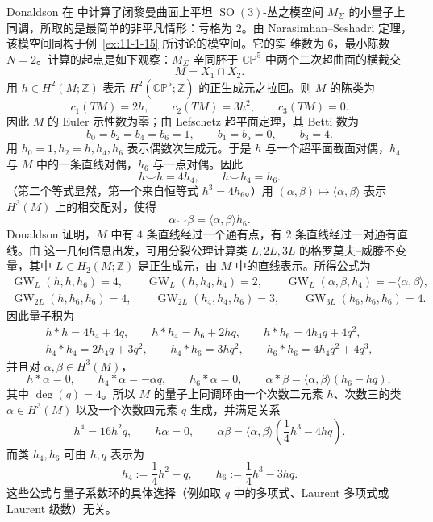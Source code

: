 \begin{example}\label{ex:11-1-16}
Donaldson 在  中计算了闭黎曼曲面上平坦 $\operatorname{SO}(3)$-丛之模空间
$M_\Sigma$ 的小量子上同调，所取的是最简单的非平凡情形：亏格为 $2$。由
Narasimhan--Seshadri 定理，该模空间同构于例~\ref{ex:11-1-15} 所讨论的模空间。它的实
维数为 $6$，最小陈数 $N=2$。计算的起点是如下观察：$M_\Sigma$ 辛同胚于
$\mathbb{CP}^5$ 中两个二次超曲面的横截交
\[
  M=X_1\cap X_2.
\]
用 $h\in H^2(M;\mathbb Z)$ 表示 $H^2(\mathbb{CP}^5;\mathbb Z)$ 的正生成元之拉回。则
$M$ 的陈类为
\[
  c_1(TM)=2h,\qquad c_2(TM)=3h^2,\qquad c_3(TM)=0.
\]
因此 $M$ 的 Euler 示性数为零；由 Lefschetz 超平面定理，其 Betti 数为
\[
  b_0=b_2=b_4=b_6=1,\qquad b_1=b_5=0,\qquad b_3=4.
\]
用 $h_0=1,h_2=h,h_4,h_6$ 表示偶数次生成元。于是 $h$ 与一个超平面截面对偶，$h_4$ 与
$M$ 中的一条直线对偶，$h_6$ 与一点对偶。因此
\[
  h\smile h=4h_4,\qquad h\smile h_4=h_6.
\]
（第二个等式显然，第一个来自恒等式 $h^3=4h_6$。）用
$(\alpha,\beta)\mapsto\langle\alpha,\beta\rangle$ 表示 $H^3(M)$ 上的相交配对，使得
\[
  \alpha\smile\beta=\langle\alpha,\beta\rangle h_6.
\]
Donaldson 证明，$M$ 中有 $4$ 条直线经过一个通有点，有 $2$ 条直线经过一对通有直线。由
这一几何信息出发，可用分裂公理计算类 $L,2L,3L$ 的格罗莫夫--威滕不变量，其中
$L\in H_2(M;\mathbb Z)$ 是正生成元，由 $M$ 中的直线表示。所得公式为
\[
\begin{gathered}
  \operatorname{GW}_{L}(h,h,h_6)=4,\qquad
  \operatorname{GW}_{L}(h,h_4,h_4)=2,\qquad
  \operatorname{GW}_{L}(\alpha,\beta,h_4)=-\langle\alpha,\beta\rangle,\\
  \operatorname{GW}_{2L}(h,h_6,h_6)=4,\qquad
  \operatorname{GW}_{2L}(h_4,h_4,h_6)=3,\qquad
  \operatorname{GW}_{3L}(h_6,h_6,h_6)=4.
\end{gathered}
\]
因此量子积为
\[
\begin{gathered}
  h*h=4h_4+4q,\qquad h*h_4=h_6+2hq,\qquad
  h*h_6=4h_4q+4q^2,\\
  h_4*h_4=2h_4q+3q^2,\qquad h_4*h_6=3hq^2,\qquad
  h_6*h_6=4h_4q^2+4q^3,
\end{gathered}
\]
并且对 $\alpha,\beta\in H^3(M)$，
\[
  h*\alpha=0,\qquad h_4*\alpha=-\alpha q,\qquad h_6*\alpha=0,\qquad
  \alpha*\beta=\langle\alpha,\beta\rangle(h_6-hq),
\]
其中 $\deg(q)=4$。所以 $M$ 的量子上同调环由一个次数二元素 $h$、次数三的类
$\alpha\in H^3(M)$ 以及一个次数四元素 $q$ 生成，并满足关系
\[
  h^4=16h^2q,\qquad h\alpha=0,\qquad
  \alpha\beta=\langle\alpha,\beta\rangle
  \left(\frac14h^3-4hq\right).
\]
而类 $h_4,h_6$ 可由 $h,q$ 表示为
\[
  h_4:=\frac14h^2-q,\qquad h_6:=\frac14h^3-3hq.
\]
这些公式与量子系数环的具体选择（例如取 $q$ 中的多项式、Laurent 多项式或 Laurent
级数）无关。
\end{example}

